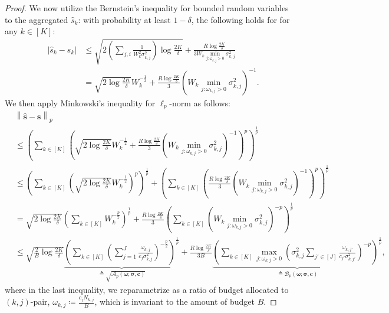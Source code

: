 \documentclass{article}
\def\vc{{\bm{c}}}
\def\vs{{\bm{s}}}
\def\gA{{\mathcal{A}}}
\def\gB{{\mathcal{B}}}
\theoremstyle{plain}
\theoremstyle{definition}
\theoremstyle{plain}
\newcommand{\bignorm}[1]{\left\lVert #1 \right\rVert}
\begin{document}
\begin{proof}
    We now utilize the Bernstein's inequality for bounded random variables~\citep{bernstein} to the aggregated $\hat{s}_k$: with probability at least $1 - \delta$, the following holds for for any $k \in [K]$:
    \begin{align}
        \left| \hat{s}_k - s_k \right| &\leq \sqrt{2 \left( \sum_{j,i} \frac{1}{W_k^2 \sigma_{k,j}^2} \right) \log\frac{2 K}{\delta}} + \frac{R \log\frac{2 K}{\delta}}{3 W_k \min_{j : \omega_{k,j}>0} \sigma_{k,j}^2} \\
        &= \sqrt{2 \log\frac{2 K}{\delta}} W_k^{-\frac{1}{2}} + \frac{R \log\frac{2 K}{\delta}}{3} \left( W_k \min_{j : \omega_{k,j}>0} \sigma_{k,j}^2 \right)^{-1}.
    \end{align}
    We then apply Minkowski's inequality for $\ell_p$-norm as follows:
    \begin{align}
        &\bignorm{\hat{\vs} - \vs}_p \\
        &\leq \left( \sum_{k \in [K]} \left( \sqrt{2 \log\frac{2 K}{\delta}} W_k^{-\frac{1}{2}} + \frac{R \log\frac{2 K}{\delta}}{3} \left( W_k \min_{j : \omega_{k,j}>0} \sigma_{k,j}^2 \right)^{-1} \right)^p \right)^{\frac{1}{p}} \\
        &\leq \left( \sum_{k \in [K]} \left( \sqrt{2 \log\frac{2 K}{\delta}} W_k^{-\frac{1}{2}} \right)^p \right)^{\frac{1}{p}} + \left( \sum_{k \in [K]} \left( \frac{R \log\frac{2 K}{\delta}}{3} \left( W_k \min_{j : \omega_{k,j}>0} \sigma_{k,j}^2 \right)^{-1} \right)^p \right)^{\frac{1}{p}} \tag{Minkowski's inequality} \\
        &= \sqrt{2 \log\frac{2K}{\delta}} \left( \sum_{k \in [K]} W_k^{-\frac{p}{2}} \right)^{\frac{1}{p}} + \frac{R \log\frac{2 K}{\delta}}{3} \left( \sum_{k \in [K]} \left( W_k \min_{j : \omega_{k,j}>0} \sigma_{k,j}^2 \right)^{-p} \right)^{\frac{1}{p}} \\
        &\leq \sqrt{\frac{2}{B} \log\frac{2K}{\delta}} \underbrace{\left( \sum_{k \in [K]} \left( \sum_{j=1}^J \frac{\omega_{k,j}}{c_j \sigma_{k,j}^2} \right)^{-\frac{p}{2}} \right)^{\frac{1}{p}}}_{\triangleq \sqrt{\gA_p(\bm\omega; \bm\sigma, \vc)}}  + \frac{R \log\frac{2 K}{\delta}}{3 B} \underbrace{\left( \sum_{k \in [K]} \max_{j: \omega_{k,j} > 0} \left( \sigma_{k,j}^2 \sum_{j'\in[J]} \frac{\omega_{k,j'}}{c_{j'} \sigma_{k,j'}^2} \right)^{-p} \right)^{\frac{1}{p}}}_{\triangleq \gB_p(\bm\omega; \bm\sigma, \vc)},
    \end{align}
    where in the last inequality, we reparametrize as a ratio of budget allocated to $(k,j)$-pair, $\omega_{k,j} \coloneq \frac{c_j N_{k,j}}{B}$, which is invariant to the amount of budget $B$.
\end{proof}
\end{document}
